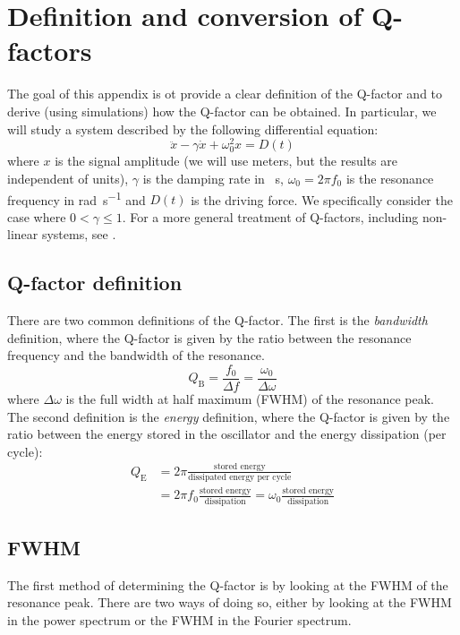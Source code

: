 \chapter{Definition and conversion of Q-factors}
\label{app:q_factors}

The goal of this appendix is ot provide a clear definition of the Q-factor and to derive (using simulations) how the Q-factor can be obtained. In particular, we will study a system described by the following differential equation:
\begin{equation}
    \ddot{x} - \gamma \dot{x} + \omega_0^2 x = D(t)
    \tag{damped h.o.}
\end{equation}
where $x$ is the signal amplitude (we will use meters, but the results are independent of units), $\gamma$ is the damping rate in \unit{\per\second}, $\omega_0 = 2\pi f_0$ is the resonance frequency in \unit{\radian\per\second} and $D(t)$ is the driving force. We specifically consider the case where $0 < \gamma \leq 1$. For a more general treatment of Q-factors, including non-linear systems, see \textcite{wang_rigorous_2017}.

\section{Q-factor definition}
There are two common definitions of the Q-factor. The first is the \textit{bandwidth} definition, where the Q-factor is given by the ratio between the resonance frequency and the bandwidth of the resonance.
\begin{equation}
    Q_\text{B} = \frac{f_0}{\Delta f} = \frac{\omega_0}{\Delta \omega}
    \tag{bandwidth definition}
\end{equation}
where $\Delta \omega$ is the full width at half maximum (FWHM) of the resonance peak. The second definition is the \textit{energy} definition, where the Q-factor is given by the ratio between the energy stored in the oscillator and the energy dissipation (per cycle):
\begin{align}
    Q_\text{E} &= 2\pi \frac{\text{stored energy}}{\text{dissipated energy per cycle}} \nonumber \\
               &= 2\pi f_0 \frac{\text{stored energy}}{\text{dissipation}} = \omega_0 \frac{\text{stored energy}}{\text{dissipation}} \tag{energy definition}
\end{align}

\section{FWHM}
The first method of determining the Q-factor is by looking at the FWHM of the resonance peak. There are two ways of doing so, either by looking at the FWHM in the power spectrum or the FWHM in the Fourier spectrum.

